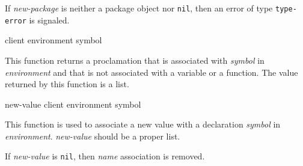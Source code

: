 If \textit{new-package} is neither a package object nor \texttt{nil},
then an error of type \texttt{type-error} is signaled.

 {client environment symbol}

This function returns a proclamation that is associated with
\textit{symbol} in \textit{environment} and that is not associated with a
variable or a function.  The value returned by this function is a list.

 {new-value client environment symbol}

This function is used to associate a new value with a declaration
\textit{symbol} in \textit{environment}. \textit{new-value} should be
a proper list.

If \textit{new-value} is \texttt{nil}, then \textit{name} association is removed.
